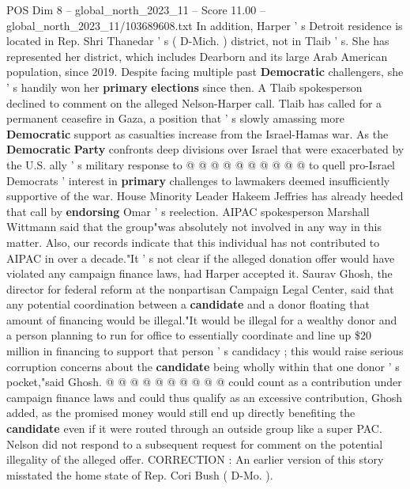 \begin{textsample}{POS Dim 8 – global\_north\_2023\_11 – Score 11.00 – global\_north\_2023\_11/103689608.txt}
In addition, Harper ' s Detroit residence is located in Rep.
Shri Thanedar ' s ( D-Mich. ) district, not in Tlaib ' s.
She has represented her district, which includes Dearborn and its large Arab American population, since 2019.
Despite facing multiple past \textbf{Democratic} challengers, she ' s handily won her \textbf{primary} \textbf{elections} since then.
A Tlaib spokesperson declined to comment on the alleged Nelson-Harper call.
Tlaib has called for a permanent ceasefire in Gaza, a position that ' s slowly amassing more \textbf{Democratic} support as casualties increase from the Israel-Hamas war.
As the \textbf{Democratic} \textbf{Party} confronts deep divisions over Israel that were exacerbated by the U.S. ally ' s military response to @ @ @ @ @ @ @ @ @ @ to quell pro-Israel Democrats ' interest in \textbf{primary} challenges to lawmakers deemed insufficiently supportive of the war.
House Minority Leader Hakeem Jeffries has already heeded that call by \textbf{endorsing} Omar ' s reelection.
AIPAC spokesperson Marshall Wittmann said that the group"was absolutely not involved in any way in this matter.
Also, our records indicate that this individual has not contributed to AIPAC in over a decade."It ' s not clear if the alleged donation offer would have violated any campaign finance laws, had Harper accepted it.
Saurav Ghosh, the director for federal reform at the nonpartisan Campaign Legal Center, said that any potential coordination between a \textbf{candidate} and a donor floating that amount of financing would be illegal."It would be illegal for a wealthy donor and a person planning to run for office to essentially coordinate and line up \$20 million in financing to support that person ' s candidacy ; this would raise serious corruption concerns about the \textbf{candidate} being wholly within that one donor ' s pocket,"said Ghosh. @ @ @ @ @ @ @ @ @ @ could count as a contribution under campaign finance laws and could thus qualify as an excessive contribution, Ghosh added, as the promised money would still end up directly benefiting the \textbf{candidate} even if it were routed through an outside group like a super PAC.
Nelson did not respond to a subsequent request for comment on the potential illegality of the alleged offer.
CORRECTION : An earlier version of this story misstated the home state of Rep.
Cori Bush ( D-Mo. ).

\end{textsample}
